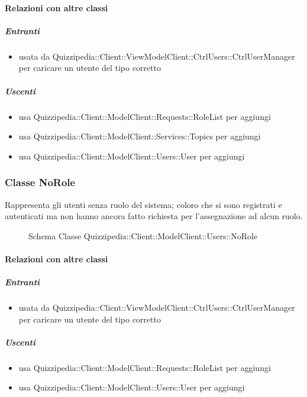 \paragraph{Relazioni con altre classi}
\subparagraph{Entranti}
\begin{itemize}
\item usata da Quizzipedia::Client::ViewModelClient::CtrlUsers::CtrlUserManager per caricare un utente del tipo corretto
\end{itemize}
\subparagraph{Uscenti}
\begin{itemize}
\item usa Quizzipedia::Client::ModelClient::Requests::RoleList per aggiungi
\item usa Quizzipedia::Client::ModelClient::Services::Topics per aggiungi
\item usa Quizzipedia::Client::ModelClient::Users::User per aggiungi
\end{itemize}
\subsubsection{Classe NoRole}
Rappresenta gli utenti senza ruolo del sistema; coloro che si sono registrati e autenticati ma non hanno ancora fatto richiesta per l'assegnazione ad alcun ruolo.
\begin{figure}[H]
\centering
\noindent{}
\caption[Schema Classe NoRole]{Schema Classe Quizzipedia::Client::ModelClient::Users::NoRole}
\end{figure}
\paragraph{Relazioni con altre classi}
\subparagraph{Entranti}
\begin{itemize}
\item usata da Quizzipedia::Client::ViewModelClient::CtrlUsers::CtrlUserManager per caricare un utente del tipo corretto
\end{itemize}
\subparagraph{Uscenti}
\begin{itemize}
\item usa Quizzipedia::Client::ModelClient::Requests::RoleList per aggiungi
\item usa Quizzipedia::Client::ModelClient::Users::User per aggiungi
\end{itemize}
